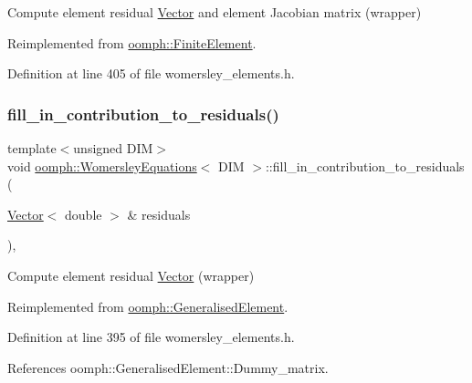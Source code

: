 Compute element residual \hyperlink{classoomph_1_1Vector}{Vector} and element Jacobian matrix (wrapper) 



Reimplemented from \hyperlink{classoomph_1_1FiniteElement_a0ae7af222af38a0d53bf283dc85bdfea}{oomph\+::\+Finite\+Element}.



Definition at line 405 of file womersley\+\_\+elements.\+h.

\mbox{\label{classoomph_1_1WomersleyEquations_ad0c342503c279bc697530d87059e7d48}} 
\subsubsection{\texorpdfstring{fill\+\_\+in\+\_\+contribution\+\_\+to\+\_\+residuals()}{fill\_in\_contribution\_to\_residuals()}}
{\footnotesize\ttfamily template$<$unsigned D\+IM$>$ \\
void \hyperlink{classoomph_1_1WomersleyEquations}{oomph\+::\+Womersley\+Equations}$<$ D\+IM $>$\+::fill\+\_\+in\+\_\+contribution\+\_\+to\+\_\+residuals (\begin{DoxyParamCaption}\item[{\hyperlink{classoomph_1_1Vector}{Vector}$<$ double $>$ \&}]{residuals }\end{DoxyParamCaption})\hspace{0.3cm}{\ttfamily [inline]}, {\ttfamily [virtual]}}



Compute element residual \hyperlink{classoomph_1_1Vector}{Vector} (wrapper) 



Reimplemented from \hyperlink{classoomph_1_1GeneralisedElement_a310c97f515e8504a48179c0e72c550d7}{oomph\+::\+Generalised\+Element}.



Definition at line 395 of file womersley\+\_\+elements.\+h.



References oomph\+::\+Generalised\+Element\+::\+Dummy\+\_\+matrix.


